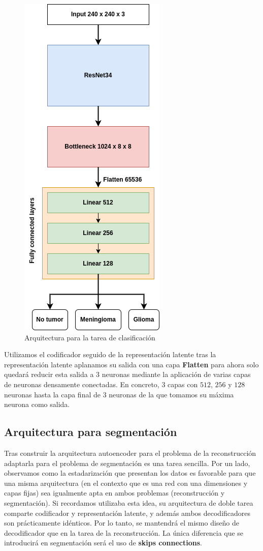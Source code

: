 \begin{figure}[H]
	\centering
	\includegraphics[width=0.3\linewidth]{imagenes/arquitectura_clasificacion.png}
	\caption{Arquitectura para la tarea de clasificación}
\end{figure}

Utilizamos el codificador seguido de la representación latente tras la representación latente aplanamos su salida con una capa \textbf{Flatten} para ahora solo quedará reducir esta salida a $3$ neuronas mediante la aplicación de varias capas de neuronas densamente conectadas. En concreto, $3$ capas con $512$, $256$ y $128$ neuronas hasta la capa final de $3$ neuronas de la que tomamos su máxima neurona como salida.

\subsection{Arquitectura para segmentación}

Tras construir la arquitectura autoencoder para el problema de la reconstrucción adaptarla para el problema de segmentación es una tarea sencilla. Por un lado, observamos como la estadarización que presentan los datos es favorable para que una misma arquitectura (en el contexto que es una red con una dimensiones y capas fijas) sea igualmente apta en ambos problemas (reconstrucción y segmentación). Si recordamos \cite{myronenko20193d} utilizaba esta idea, su arquitectura de doble tarea comparte codificador y representación latente, y además ambos decodificadores son prácticamente idénticos. Por lo tanto, se mantendrá el mismo diseño de decodificador que en la tarea de la reconstrucción. La única diferencia que se introducirá en segmentación será el uso de \textbf{skips connections}.

